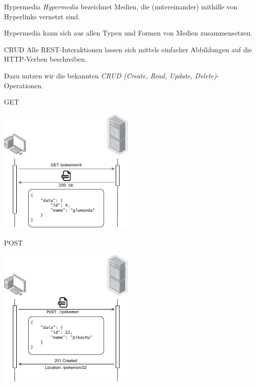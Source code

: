 \begin{defi}{Hypermedia}
    \emph{Hypermedia} bezeichnet Medien, die (untereinander) mithilfe von Hyperlinks vernetzt sind.

    Hypermedia kann sich aus allen Typen und Formen von Medien zusammensetzen.
\end{defi}

\begin{defi}{CRUD}
    Alle REST-Interaktionen lassen sich mittels einfacher Abbildungen auf die HTTP-Verben beschreiben.

    Dazu nutzen wir die bekannten \emph{CRUD (Create, Read, Update, Delete)}-Operationen.
\end{defi}

\begin{example}{GET}
    \begin{center}
        \includegraphics[width=0.5\textwidth]{includes/figures/example_rest_get.pdf}
    \end{center}
\end{example}

\begin{example}{POST}
    \begin{center}
        \includegraphics[width=0.5\textwidth]{includes/figures/example_rest_post.pdf}
    \end{center}
\end{example}

